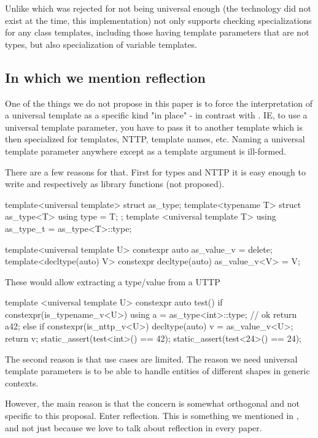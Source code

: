 \documentclass{wg21}
\begin{document}
Unlike  which was rejected for not being universal enough (the technology did not exist at the time, this implementation) not only supports checking
specializations for any class templates, including those having template parameters that are not types, but also specialization of variable templates.

\subsection{In which we mention reflection}

One of the things we do not propose in this paper is to force the interpretation of a universal template as a specific kind "in place" - in contrast with .
IE, to use a universal template parameter, you have to pass it to another template which is then specialized for templates, NTTP, template names, etc.
Naming a universal template parameter anywhere except as a template argument is ill-formed.

There are a few reasons for that.
First for types and NTTP it is easy enough to write  and  respectively as library functions (not proposed).

\begin{colorblock}
template<universal template>
struct as_type;
template<typename T>
struct as_type<T> { using type = T; };
template <universal template T>
using as_type_t = as_type<T>::type;

template<universal template U>
constexpr auto as_value_v = delete;
template<decltype(auto) V>
constexpr decltype(auto) as_value_v<V> = V;
\end{colorblock}

These would allow extracting a type/value from a UTTP

\begin{colorblock}
template <universal template U>
constexpr auto test() {
    if constexpr(is_typename_v<U>) {
        using a =  as_type<int>::type; // ok
        return a{42};
    }
    else if constexpr(is_nttp_v<U>) {
        decltype(auto) v = as_value_v<U>;
        return v;
    }
}
static_assert(test<int>() == 42);
static_assert(test<24>() == 24);
\end{colorblock}

The second reason is that use cases are limited.
The reason we need universal template parameters is to be able to handle entities of different shapes in generic contexts.

However, the main reason is that the concern is somewhat orthogonal and not specific to this proposal.
Enter reflection.
This is something we mentioned in , and not just because we love to talk about reflection in every paper.
\end{document}
